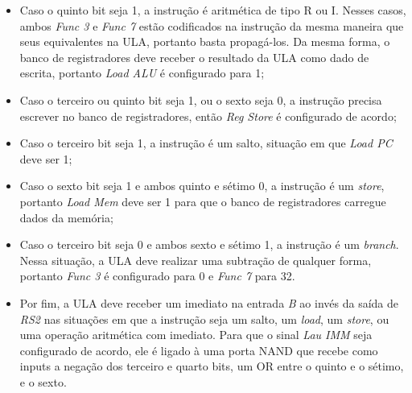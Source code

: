 \documentclass[twocolumn]{article}
\begin{document}
\begin{itemize}
\item Caso o quinto bit seja 1, a instrução é aritmética de tipo R ou I. Nesses
  casos, ambos \textit{Func 3} e \textit{Func 7} estão codificados na instrução
  da mesma maneira que seus equivalentes na ULA, portanto basta
  propagá-los. Da mesma forma, o banco de registradores deve receber o resultado
  da ULA como dado de escrita, portanto \textit{Load ALU} é configurado para 1;
\item Caso o terceiro ou quinto bit seja 1, ou o sexto seja 0, a instrução
  precisa escrever no banco de registradores, então \textit{Reg Store} é
  configurado de acordo;
\item Caso o terceiro bit seja 1, a instrução é um salto, situação em que
  \textit{Load PC} deve ser 1;
\item Caso o sexto bit seja 1 e ambos quinto e sétimo 0, a instrução é um
  \textit{store}, portanto \textit{Load Mem} deve ser 1 para que o banco de
  registradores carregue dados da memória;
\item Caso o terceiro bit seja 0 e ambos sexto e sétimo 1, a instrução é um
  \textit{branch}. Nessa situação, a ULA deve realizar uma subtração de qualquer
  forma, portanto \textit{Func 3} é configurado para 0 e \textit{Func 7} para
  32.
\item Por fim, a ULA deve receber um imediato na entrada \textit{B} ao invés da
  saída de \textit{RS2} nas situações em que a instrução seja um salto, um
  \textit{load}, um \textit{store}, ou uma operação aritmética com
  imediato. Para que o sinal \textit{Lau IMM} seja configurado de acordo, ele é
  ligado à uma porta NAND que recebe como inputs a negação dos terceiro e quarto
  bits, um OR entre o quinto e o sétimo, e o sexto.
\end{itemize}

{}

\end{document}
